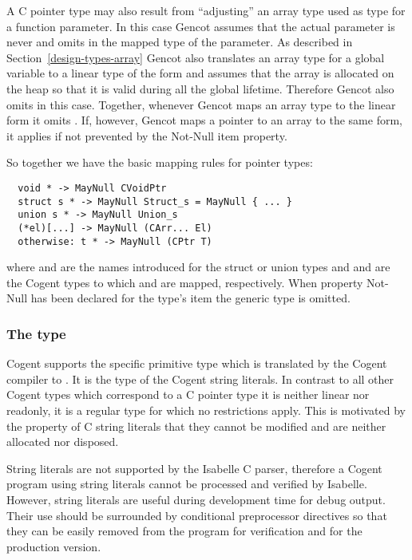 A C pointer type may also result from ``adjusting'' an array type used as type for a function parameter. In this case Gencot
assumes that the actual parameter is never  and omits  in the mapped type of the parameter.
As described in Section~\ref{design-types-array} Gencot also translates an array type for a global variable to a linear
type of the form  and assumes that the array is allocated on the heap so that it is valid during all 
the global lifetime. Therefore Gencot also omits  in this case. Together, whenever Gencot maps an array type
to the linear form  it omits . If, however, Gencot maps a pointer to an array to the 
same form, it applies  if not prevented by the Not-Null item property.

So together we have the basic mapping rules for pointer types:
\begin{verbatim}
  void * -> MayNull CVoidPtr
  struct s * -> MayNull Struct_s = MayNull { ... }
  union s * -> MayNull Union_s
  (*el)[...] -> MayNull (CArr... El)
  otherwise: t * -> MayNull (CPtr T)
\end{verbatim}
where  and  are the names introduced for the struct or union types and  
and  are the Cogent types to which  and  are mapped, respectively. When property
Not-Null has been declared for the type's item the generic type  is omitted.

\subsubsection{The  type}

Cogent supports the specific primitive type  which is translated by the Cogent compiler to .
It is the type of the Cogent string literals. In contrast to all other Cogent types which correspond to a C pointer
type it is neither linear nor readonly, it is a regular type for which no restrictions apply. This is motivated
by the property of C string literals that they cannot be modified and are neither allocated nor disposed.

String literals are not supported by the Isabelle C parser, therefore a Cogent program using string literals cannot
be processed and verified by Isabelle. However, string literals are useful during development time for debug 
output. Their use should be surrounded by conditional preprocessor directives so that they can be easily removed
from the program for verification and for the production version. 

